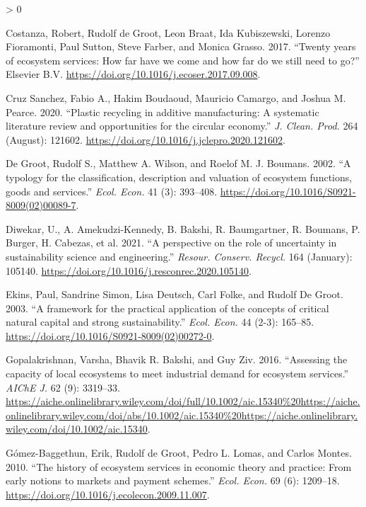 \documentclass[
]{article}
\newlength{\cslhangindent}
\newenvironment{CSLReferences}[2] %
 {%
  \setlength{\parindent}{0pt}
  \ifodd #1 \everypar{\setlength{\hangindent}{\cslhangindent}}\ignorespaces\fi
  \ifnum #2 > 0
  \setlength{\parskip}{#2\baselineskip}
  \fi
 }%
 {}
\begin{document}
\begin{CSLReferences}{1}{0}
\leavevmode\hypertarget{ref-Costanza2017}{}%
Costanza, Robert, Rudolf de Groot, Leon Braat, Ida Kubiszewski, Lorenzo Fioramonti, Paul Sutton, Steve Farber, and Monica Grasso. 2017. {``{Twenty years of ecosystem services: How far have we come and how far do we still need to go?}''} Elsevier B.V. \url{https://doi.org/10.1016/j.ecoser.2017.09.008}.

\leavevmode\hypertarget{ref-CruzSanchez2020}{}%
Cruz Sanchez, Fabio A., Hakim Boudaoud, Mauricio Camargo, and Joshua M. Pearce. 2020. {``{Plastic recycling in additive manufacturing: A systematic literature review and opportunities for the circular economy}.''} \emph{J. Clean. Prod.} 264 (August): 121602. \url{https://doi.org/10.1016/j.jclepro.2020.121602}.

\leavevmode\hypertarget{ref-DeGroot2002}{}%
De Groot, Rudolf S., Matthew A. Wilson, and Roelof M. J. Boumans. 2002. {``{A typology for the classification, description and valuation of ecosystem functions, goods and services}.''} \emph{Ecol. Econ.} 41 (3): 393--408. \url{https://doi.org/10.1016/S0921-8009(02)00089-7}.

\leavevmode\hypertarget{ref-Diwekar2021}{}%
Diwekar, U., A. Amekudzi-Kennedy, B. Bakshi, R. Baumgartner, R. Boumans, P. Burger, H. Cabezas, et al. 2021. {``{A perspective on the role of uncertainty in sustainability science and engineering}.''} \emph{Resour. Conserv. Recycl.} 164 (January): 105140. \url{https://doi.org/10.1016/j.resconrec.2020.105140}.

\leavevmode\hypertarget{ref-Ekins2003}{}%
Ekins, Paul, Sandrine Simon, Lisa Deutsch, Carl Folke, and Rudolf De Groot. 2003. {``{A framework for the practical application of the concepts of critical natural capital and strong sustainability}.''} \emph{Ecol. Econ.} 44 (2-3): 165--85. \url{https://doi.org/10.1016/S0921-8009(02)00272-0}.

\leavevmode\hypertarget{ref-Gopalakrishnan2016}{}%
Gopalakrishnan, Varsha, Bhavik R. Bakshi, and Guy Ziv. 2016. {``{Assessing the capacity of local ecosystems to meet industrial demand for ecosystem services}.''} \emph{AIChE J.} 62 (9): 3319--33. \url{https://aiche.onlinelibrary.wiley.com/doi/full/10.1002/aic.15340\%20https://aiche.onlinelibrary.wiley.com/doi/abs/10.1002/aic.15340\%20https://aiche.onlinelibrary.wiley.com/doi/10.1002/aic.15340}.

\leavevmode\hypertarget{ref-Gomez-Baggethun2010}{}%
Gómez-Baggethun, Erik, Rudolf de Groot, Pedro L. Lomas, and Carlos Montes. 2010. {``{The history of ecosystem services in economic theory and practice: From early notions to markets and payment schemes}.''} \emph{Ecol. Econ.} 69 (6): 1209--18. \url{https://doi.org/10.1016/j.ecolecon.2009.11.007}.


\end{CSLReferences}
\end{document}
